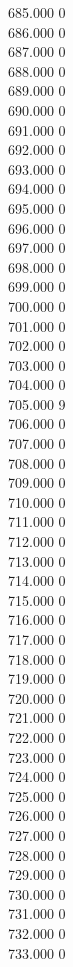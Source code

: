 { 685.000	0 \\
 686.000	0 \\
 687.000	0 \\
 688.000	0 \\
 689.000	0 \\
 690.000	0 \\
 691.000	0 \\
 692.000	0 \\
 693.000	0 \\
 694.000	0 \\
 695.000	0 \\
 696.000	0 \\
 697.000	0 \\
 698.000	0 \\
 699.000	0 \\
 700.000	0 \\
 701.000	0 \\
 702.000	0 \\
 703.000	0 \\
 704.000	0 \\
 705.000	9 \\
 706.000	0 \\
 707.000	0 \\
 708.000	0 \\
 709.000	0 \\
 710.000	0 \\
 711.000	0 \\
 712.000	0 \\
 713.000	0 \\
 714.000	0 \\
 715.000	0 \\
 716.000	0 \\
 717.000	0 \\
 718.000	0 \\
 719.000	0 \\
 720.000	0 \\
 721.000	0 \\
 722.000	0 \\
 723.000	0 \\
 724.000	0 \\
 725.000	0 \\
 726.000	0 \\
 727.000	0 \\
 728.000	0 \\
 729.000	0 \\
 730.000	0 \\
 731.000	0 \\
 732.000	0 \\
 733.000	0 \\
}
